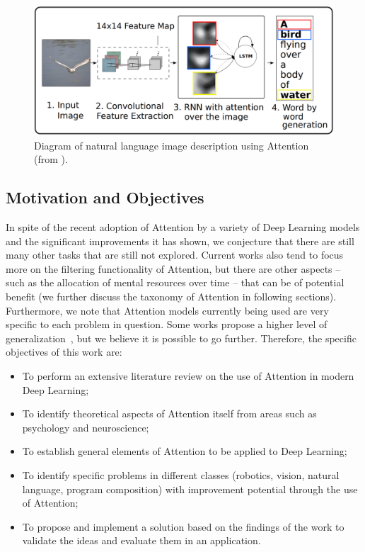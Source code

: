 \documentclass[12pt]{article}
\begin{document}
\newpage
\begin{figure}
\begin{center}
	\includegraphics[width=0.7\linewidth]{./img/img_captioning.png}
\caption{
    Diagram of natural language image description using Attention
    (from \cite{ref:img-captioning}).
}
\label{fig:description}
\end{center}
\end{figure}

\subsection{Motivation and Objectives}
In spite of the recent adoption of Attention by a variety of Deep Learning models
and the significant improvements it has shown, we conjecture that there are still many other tasks
that are still not explored.
Current works also tend to focus more on the filtering functionality of Attention,
but there are other aspects
-- such as the allocation of mental resources over time -- that can be of potential benefit
(we further discuss the taxonomy of Attention in following sections).
Furthermore, we note that Attention models currently being used
are very specific to each problem in question.
Some works propose a higher level of generalization~\cite{ref:rec-models},
but we believe it is possible to go further.
Therefore, the specific objectives of this work are:
\begin{itemize}
    \item To perform an extensive literature review on the use of Attention
        in modern Deep Learning;
    \item To identify theoretical aspects of Attention itself from areas such as psychology and neuroscience;
    \item To establish general elements of Attention to be applied to Deep Learning;
    \item To identify specific problems in different classes
        (robotics, vision, natural language, program composition) with
        improvement potential through the use of Attention;
    \item To propose and implement a solution based on the findings of the work to
        validate the ideas and evaluate them in an application.
\end{itemize}
\end{document}
